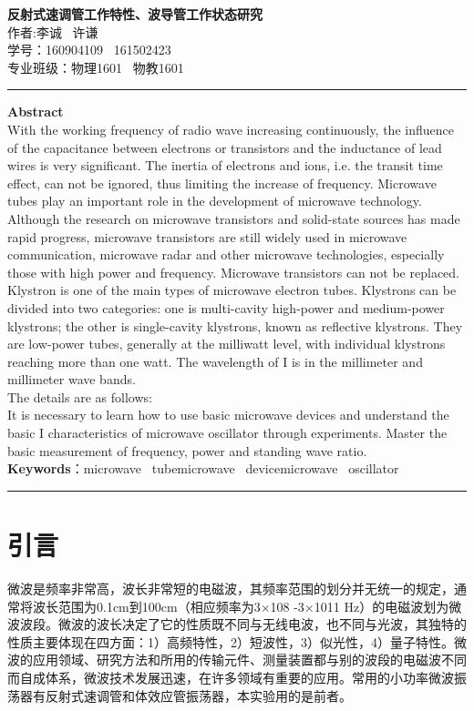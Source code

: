 \documentclass{hfutpaper}
\begin{document}
\vspace{6em}
\begin{center}
\LARGE
  \textbf{反射式速调管工作特性、波导管工作状态研究}\\
  \vspace{1em}
  \large
    作者:李诚 \ 许谦\\ 学号：160904109 \ 161502423\\%
  专业班级：物理1601 \ 物教1601
  \end{center}
  \vspace{10em}
\rule[0.1\baselineskip]{\textwidth}{0.5pt}
\textbf{Abstract}\\
\large
With the working frequency of radio wave increasing continuously, the influence of the capacitance between electrons or transistors and the inductance of lead wires is very significant. The inertia of electrons and ions, i.e. the transit time effect, can not be ignored, thus limiting the increase of frequency. Microwave tubes play an important role in the development of microwave technology. Although the research on microwave transistors and solid-state sources has made rapid progress, microwave transistors are still widely used in microwave communication, microwave radar and other microwave technologies, especially those with high power and frequency. Microwave transistors can not be replaced. Klystron is one of the main types of microwave electron tubes. Klystrons can be divided into two categories: one is multi-cavity high-power and medium-power klystrons; the other is single-cavity klystrons, known as reflective klystrons. They are low-power tubes, generally at the milliwatt level, with individual klystrons reaching more than one watt. The wavelength of I is in the millimeter and millimeter wave bands.\\
The details are as follows:\\            
It is necessary to learn how to use basic microwave devices and understand the basic I characteristics of microwave oscillator through experiments. Master the basic measurement of frequency, power and standing wave ratio.\\
\textbf{Keywords}：microwave \ tube\quad microwave \ device\quad microwave \ oscillator\\
\rule[0.1\baselineskip]{\textwidth}{0.5pt}
\clearpage
\section{引言}
微波是频率非常高，波长非常短的电磁波，其频率范围的划分并无统一的规定，通常将波长范围为0.1cm到100cm（相应频率为3×108 -3×1011 Hz）的电磁波划为微波波段。微波的波长决定了它的性质既不同与无线电波，也不同与光波，其独特的性质主要体现在四方面：1）高频特性，2）短波性，3）似光性，4）量子特性。微波的应用领域、研究方法和所用的传输元件、测量装置都与别的波段的电磁波不同而自成体系，微波技术发展迅速，在许多领域有重要的应用。常用的小功率微波振荡器有反射式速调管和体效应管振荡器，本实验用的是前者。
\end{document}
